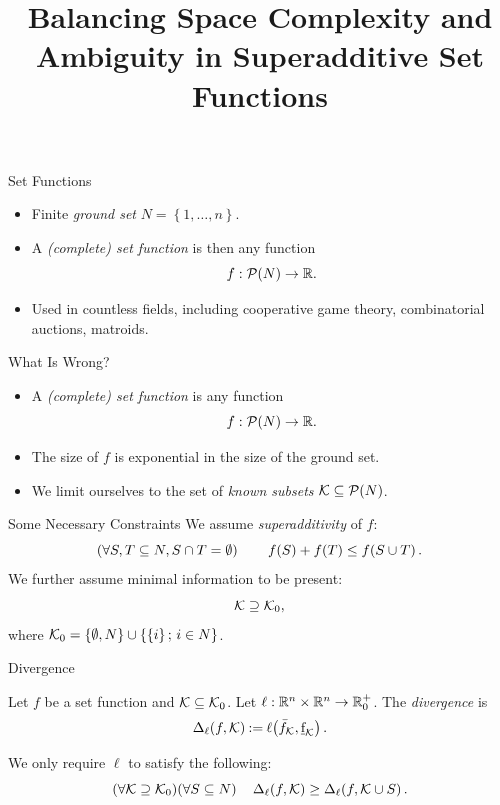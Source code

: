 \documentclass[aspectratio=169]{beamer}
\title{Balancing Space Complexity and Ambiguity in Superadditive Set Functions}
\begin{document}
\maketitle

\begin{frame}{Set Functions}
	\begin{itemize}
		\item<1-> Finite \emph{ground set} $ N = \left\{ 1, \ldots, n \right\} $.
		\item<2-> A \emph{(complete) set function} is then any function \[
			f: \mathcal{P}\!\left(N\right) \to \mathbb{R}.
		\]
		\item<3-> Used in countless fields, including cooperative game theory, combinatorial auctions, matroids.
	\end{itemize}
\end{frame}

\begin{frame}{What Is Wrong?}
	\begin{itemize}[ ]
		\item<1-> A \emph{(complete) set function} is any function \[
				f: \mathcal{P}\!\left(N\right) \to \mathbb{R}.
			\]
		\item<2-> The size of $ f $ is exponential in the size of the ground set.
		\item<3-> We limit ourselves to the set of \emph{known subsets} $ \mathcal{K} \subseteq \mathcal{P}\!\left(N\right) $.
	\end{itemize}
	
\end{frame}

\begin{frame}{Some Necessary Constraints}
	We assume \emph{superadditivity} of $ f $: \[
		\left( \forall S,T \subseteq N, S \cap T = \emptyset \right)\qquad f\!\left(S\right) + f\!\left(T\right) \leq f\!\left(S \cup T\right).
	\]
	We further assume minimal information to be present: \[
		\mathcal{K} \supseteq \mathcal{K}_0,
	\]
	where $ \mathcal{K}_0 = \left\{ \emptyset, N \right\} \cup \left\{ \left\{ i \right\} ;\, i \in N \right\} $.
\end{frame}



\begin{frame}{Divergence}
	\begin{definition}[Divergence]
		Let $ f $ be a set function and $ \mathcal{K} \subseteq \mathcal{K}_0 $.
		Let $ \ell: \mathbb{R}^n \times \mathbb{R}^n \to \mathbb{R}^+_0 $.
		The \emph{divergence} is \[
			\Delta_\ell\!\left(f, \mathcal{K}\right) \mathbin{:=} \ell\!\left(\bar f_{\mathcal{K}}, \underbar f_{\mathcal{K}}\right).
		\]
	\end{definition}
	
	\vspace{2em}
	We only require $ \ell $ to satisfy the following: \[
		\left( \forall \mathcal{K} \supseteq \mathcal{K}_0 \right)\! \left( \forall S \subseteq N \right)\quad \Delta_\ell\!\left(f, \mathcal{K}\right) \geq \Delta_\ell\!\left(f, \mathcal{K} \cup S\right).
	\]
\end{frame}
\end{document}
